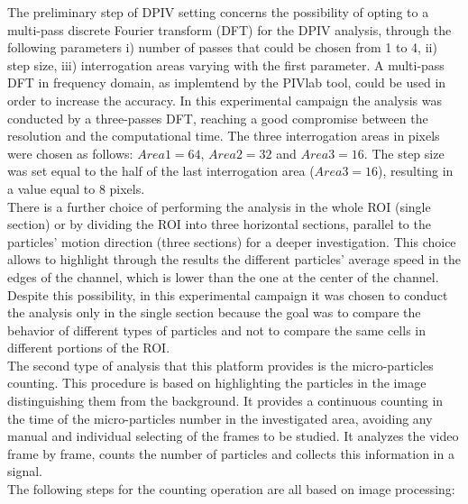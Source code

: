 \documentclass[journal]{IEEEtran}
\theoremstyle{definition}
\theoremstyle{remark}
\begin{document}
The preliminary step of DPIV setting concerns the possibility of opting to a multi-pass discrete Fourier transform (DFT) for the DPIV analysis, through the following parameters i) number of passes that could be chosen from 1 to 4, ii) step size, iii) interrogation areas varying with the first parameter. 
A multi-pass DFT in frequency domain, as implemtend by the PIVlab tool, could be used in order to increase the accuracy. In this experimental campaign the analysis was conducted by a three-passes DFT, reaching a good compromise between the resolution and the computational time. The three interrogation areas in pixels were chosen as follows: $Area1=64$, $Area2=32$ and $Area3=16$. The step size was set equal to the half of the last interrogation area ($Area3=16$), resulting in a value equal to 8 pixels.
\\There is a further choice of performing the analysis in the whole ROI (single section) or by dividing the ROI into three horizontal sections, parallel to the particles' motion direction (three sections) for a deeper investigation. This choice allows to highlight through the results the different particles' average speed in the edges of the channel, which is lower than the one at the center of the channel.
Despite this possibility, in this experimental campaign it was chosen to conduct the analysis only in the single section because the goal was to compare the behavior of different types of particles and not to compare the same cells in different portions of the ROI.
\\The second type of analysis that this platform provides is the micro-particles counting. This procedure is based on highlighting the particles in the image distinguishing them from the background. It provides a continuous counting in the time of the micro-particles number in the investigated area, avoiding any manual and individual selecting of the frames to be studied. It analyzes the video frame by frame, counts the number of particles and collects this information in a signal.
 \\The following steps for the counting operation are all based on image processing:
 
\end{document}
